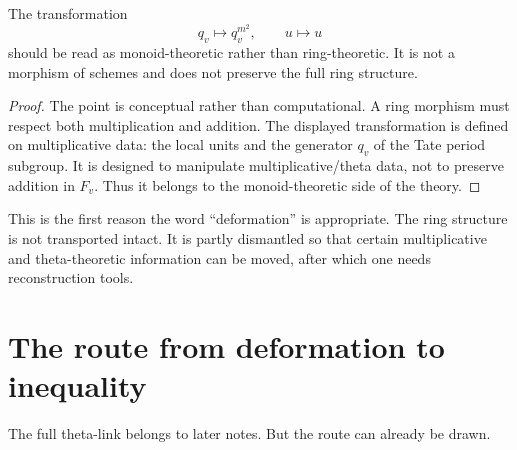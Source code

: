 \begin{proposition}
The transformation
\[
  q_v\mapsto q_v^{m^2},\qquad u\mapsto u
\]
should be read as monoid-theoretic rather than ring-theoretic.  It is not a morphism of schemes and does not preserve the full ring structure.
\end{proposition}

\begin{proof}
The point is conceptual rather than computational.  A ring morphism must respect both multiplication and addition.  The displayed transformation is defined on multiplicative data: the local units and the generator \(q_v\) of the Tate period subgroup.  It is designed to manipulate multiplicative/theta data, not to preserve addition in \(F_v\).  Thus it belongs to the monoid-theoretic side of the theory.
\end{proof}

This is the first reason the word ``deformation'' is appropriate.  The ring structure is not transported intact.  It is partly dismantled so that certain multiplicative and theta-theoretic information can be moved, after which one needs reconstruction tools.

\section{The route from deformation to inequality}

The full theta-link belongs to later notes.  But the route can already be drawn.

\begin{center}
\end{center}

